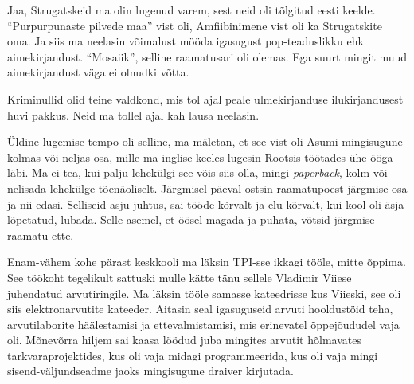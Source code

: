 Jaa, Strugatskeid ma olin lugenud varem, sest neid oli tõlgitud eesti keelde. 
\enquote{Purpurpunaste pilvede maa}\label{sisu:purpur} vist oli,  Amfiibinimene vist oli ka 
Strugatskite oma. Ja siis ma neelasin võimalust mööda igasugust pop-teaduslikku ehk 
aimekirjandust. \enquote{Mosaiik}, selline raamatusari oli olemas. Ega suurt mingit muud 
aimekirjandust väga ei olnudki võtta.

Kriminullid olid teine valdkond, mis tol ajal peale  ulmekirjanduse 
ilukirjandusest huvi pakkus. Neid ma tollel ajal kah lausa neelasin.

Üldine lugemise tempo oli selline, 
ma mäletan, et see vist oli Asumi mingisugune kolmas või neljas osa, mille ma 
inglise keeles lugesin Rootsis töötades ühe ööga läbi. Ma ei tea, kui palju lehekülgi see 
võis siis olla, mingi \emph{paperback}, kolm või nelisada lehekülge 
tõenäoliselt. Järgmisel päeval ostsin raamatupoest järgmise osa ja nii edasi. Selliseid asju juhtus, sai tööde kõrvalt ja 
elu kõrvalt, kui  kool oli äsja lõpetatud, lubada. Selle asemel, et 
öösel magada ja puhata, võtsid järgmise raamatu ette.


Enam-vähem kohe pärast keskkooli ma läksin TPI-sse ikkagi tööle, mitte õppima. See töökoht tegelikult sattuski mulle kätte tänu sellele 
Vladimir Viiese juhendatud arvutiringile. Ma 
läksin tööle samasse kateedrisse kus Viieski, see oli siis 
elektronarvutite kateeder. Aitasin seal igasuguseid arvuti hooldustöid teha, arvutilaborite 
häälestamisi ja  ettevalmistamisi, mis erinevatel õppejõududel vaja oli. 
Mõnevõrra hiljem sai kaasa löödud juba mingites arvutit hõlmavates 
tarkvaraprojektides,  kus oli vaja midagi programmeerida, kus oli vaja mingi 
sisend-väljundseadme jaoks mingisugune draiver kirjutada. 

